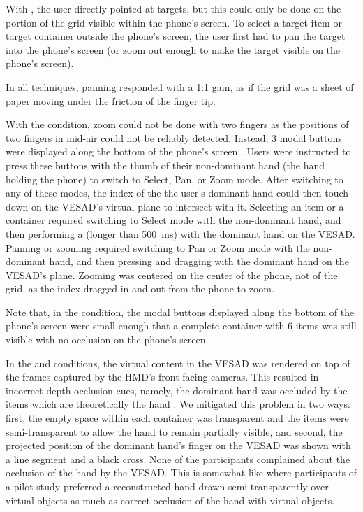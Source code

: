 With , the user directly pointed at targets, but this could only be done on the portion of the grid visible within the phone's screen. To select a target item or target container outside the phone's screen, the user first had to pan the target into the phone's screen (or zoom out enough to make the target visible on the phone's screen).

In all techniques, panning responded with a 1:1 gain, as if the grid was a sheet of paper moving under the friction of the finger tip.

With the  condition, zoom could not be done with two fingers as the positions of two fingers in mid-air could not be reliably detected. Instead, 3 modal buttons were displayed along the bottom of the phone's screen . Users were instructed to press these buttons with the thumb of their non-dominant hand (the hand holding the phone) to switch to Select, Pan, or Zoom mode. After switching to any of these modes, the index of the the user's dominant hand could then touch down on the VESAD's virtual plane to intersect with it. Selecting an item or a container required switching to Select mode with the non-dominant hand, and then performing a  (longer than \SI{500}{\ms}) with the dominant hand on the VESAD. Panning or zooming required switching to Pan or Zoom mode with the non-dominant hand, and then pressing and dragging with the dominant hand on the VESAD's plane. Zooming was centered on the center of the phone, not of the grid, as the index dragged in and out from the phone to zoom.

Note that, in the  condition, the modal buttons displayed along the bottom of the phone's screen were small enough that a complete container with 6 items was still visible with no occlusion on the phone's screen.

In the  and  conditions, the virtual content in the VESAD was rendered on top of the frames captured by the HMD's front-facing cameras. This resulted in incorrect depth occlusion cues, namely, the dominant hand was occluded by the items which are theoretically  the hand . We mitigated this problem in two ways: first, the empty space within each container was transparent and the items were semi-transparent to allow the hand to remain partially visible, and second, the projected position of the dominant hand's finger on the VESAD was shown with a line segment and a black cross. None of the participants complained about the occlusion of the hand by the VESAD. This is somewhat like \cite[Figure 3c]{Piumsomboon2014} where participants of a pilot study preferred a reconstructed hand drawn semi-transparently over virtual objects as much as correct occlusion of the hand with virtual objects.

